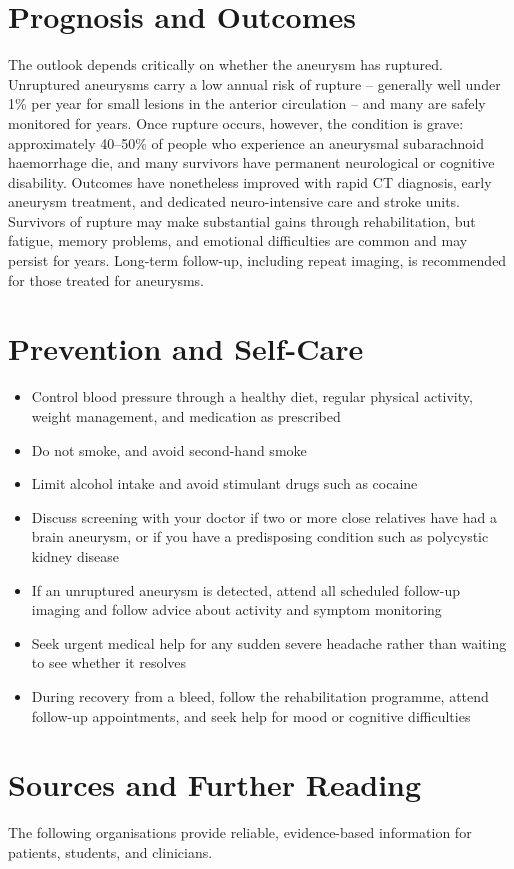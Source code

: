 \section*{Prognosis and Outcomes}
The outlook depends critically on whether the aneurysm has ruptured. Unruptured aneurysms carry a low annual risk of rupture -- generally well under 1\% per year for small lesions in the anterior circulation -- and many are safely monitored for years. Once rupture occurs, however, the condition is grave: approximately 40--50\% of people who experience an aneurysmal subarachnoid haemorrhage die, and many survivors have permanent neurological or cognitive disability. Outcomes have nonetheless improved with rapid CT diagnosis, early aneurysm treatment, and dedicated neuro-intensive care and stroke units. Survivors of rupture may make substantial gains through rehabilitation, but fatigue, memory problems, and emotional difficulties are common and may persist for years. Long-term follow-up, including repeat imaging, is recommended for those treated for aneurysms.

\section*{Prevention and Self-Care}
\begin{itemize}
    \item Control blood pressure through a healthy diet, regular physical activity, weight management, and medication as prescribed
    \item Do not smoke, and avoid second-hand smoke
    \item Limit alcohol intake and avoid stimulant drugs such as cocaine
    \item Discuss screening with your doctor if two or more close relatives have had a brain aneurysm, or if you have a predisposing condition such as polycystic kidney disease
    \item If an unruptured aneurysm is detected, attend all scheduled follow-up imaging and follow advice about activity and symptom monitoring
    \item Seek urgent medical help for any sudden severe headache rather than waiting to see whether it resolves
    \item During recovery from a bleed, follow the rehabilitation programme, attend follow-up appointments, and seek help for mood or cognitive difficulties
\end{itemize}

\section*{Sources and Further Reading}
The following organisations provide reliable, evidence-based information for patients, students, and clinicians.

